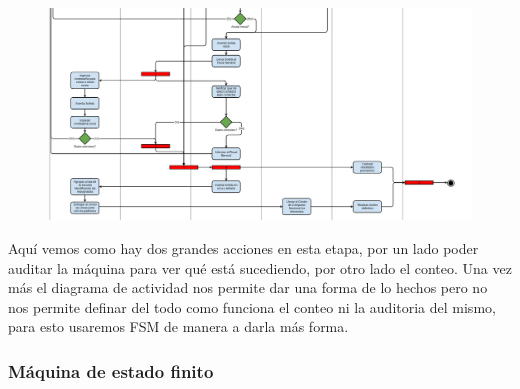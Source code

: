 \begin{figure}[h!]
\centering
\includegraphics[scale=0.45]{imagenes/actividad/actividadConteo2}
\end{figure}

Aquí vemos como hay dos grandes acciones en esta etapa, por un lado poder auditar la máquina para ver qu\'e est\'a sucediendo, por otro lado el conteo. Una vez más el diagrama de actividad nos permite dar una forma de lo hechos pero no nos permite definar del todo como funciona el conteo ni la auditoria del mismo, para esto usaremos FSM de manera a darla más forma.

\newpage

\subsubsection{Máquina de estado finito}

